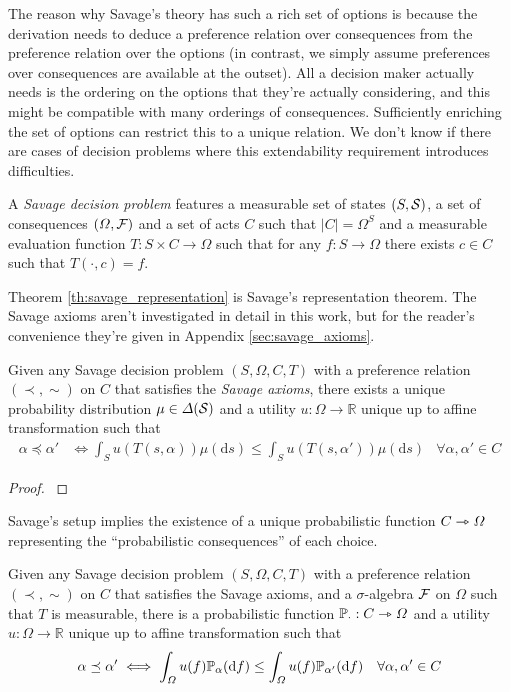 The reason why Savage's theory has such a rich set of options is because the derivation needs to deduce a preference relation over consequences from the preference relation over the options (in contrast, we simply assume preferences over consequences are available at the outset). All a decision maker actually needs is the ordering on the options that they're actually considering, and this might be compatible with many orderings of consequences. Sufficiently enriching the set of options can restrict this to a unique relation. We don't know if there are cases of decision problems where this extendability requirement introduces difficulties. 

\begin{definition}
A \emph{Savage decision problem} features a measurable set of states $(S,\mathcal{S})$, a set of consequences $(\Omega,\mathcal{F})$ and a set of acts $C$ such that $|C|=\Omega^S$ and a measurable evaluation function $T:S\times C\to \Omega$ such that for any $f:S\to \Omega$ there exists $c\in C$ such that $T(\cdot,c)=f$.
\end{definition}

Theorem \ref{th:savage_representation} is Savage's representation theorem. The Savage axioms aren't investigated in detail in this work, but for the reader's convenience they're given in Appendix \ref{sec:savage_axioms}.

\begin{theorem}\label{th:savage_representation}
Given any Savage decision problem $(S,\Omega,C,T)$ with a preference relation $(\prec,\sim)$ on $C$ that satisfies the \emph{Savage axioms}, there exists a unique probability distribution $\mu\in\Delta(\mathcal{S})$ and a utility $u:\Omega\to \mathbb{R}$ unique up to affine transformation such that
\begin{align}
    \alpha\preceq \alpha' &\iff \int_S u(T(s,\alpha))\mu(\mathrm{d}s) \leq \int_S u(T(s,\alpha'))\mu(\mathrm{d}s)&\forall \alpha,\alpha'\in C
\end{align}
\end{theorem}

\begin{proof}
\citet{savage_foundations_1954}
\end{proof}

Savage's setup implies the existence of a unique probabilistic function $C\rightarrowtriangle \Omega$ representing the ``probabilistic consequences'' of each choice.

\begin{theorem}\label{th:sav_pmap}
Given any Savage decision problem $(S,\Omega,C,T)$ with a preference relation $(\prec,\sim)$ on $C$ that satisfies the Savage axioms, and a $\sigma$-algebra $\mathcal{F}$ on $\Omega$ such that $T$ is measurable, there is a probabilistic function $\mathbb{P}_{\cdot}:C\rightarrowtriangle \Omega$ and a utility $u:\Omega\to \mathbb{R}$ unique up to affine transformation such that
\begin{align}
    \alpha\preceq \alpha' &\iff \int_\Omega u(f)\mathbb{P}_\alpha(\mathrm{d}f) \leq \int_\Omega u(f)\mathbb{P}_{\alpha'}(\mathrm{d}f)&\forall \alpha,\alpha'\in C
\end{align}
\end{theorem}

